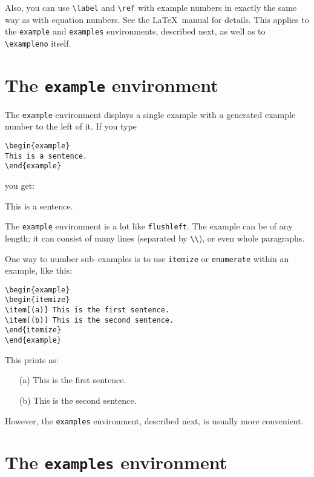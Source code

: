\documentclass{article}
\begin{document}
Also, you can use \verb"\label" and \verb"\ref" with example numbers in 
exactly the same way as with equation numbers.  See the \LaTeX\ manual for
details. This applies to the \texttt{example} and \texttt{examples} 
environments, described next, as well as to \verb"\exampleno" itself.

\section{The \texttt{example} environment}

The \texttt{example} environment displays a single example
with a generated example number to the left of it.
If you type
\begin{verbatim}
\begin{example}
This is a sentence.
\end{example}
\end{verbatim}
you get:
\begin{example}
This is a sentence.
\end{example}
The \texttt{example} environment is a lot like \texttt{flushleft}. The example
can be of any length; it can consist of many lines (separated by \verb"\\"),
or even whole paragraphs.

One way to number sub--examples is to use \texttt{itemize} or \texttt{enumerate}
within an example, like this:
\begin{verbatim}
\begin{example}
\begin{itemize}
\item[(a)] This is the first sentence.
\item[(b)] This is the second sentence.
\end{itemize}
\end{example}
\end{verbatim}
This prints as:
\begin{example}
\begin{itemize}
\item[(a)] This is the first sentence.
\item[(b)] This is the second sentence.
\end{itemize}
\end{example}
However, the \texttt{examples} environment, described next, is usually more 
convenient.

\section{The \texttt{examples} environment}
\end{document}
